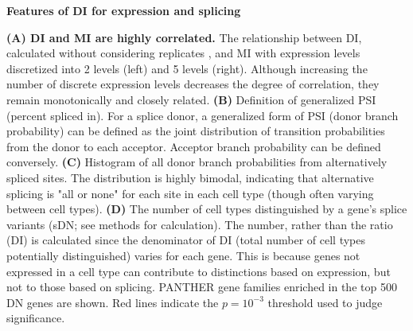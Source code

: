 \textbf{Features of DI for expression and splicing}

\textbf{(A) DI and MI are highly correlated.} The relationship between DI, calculated without considering replicates%
, and MI with expression levels discretized into 2 levels (left) and 5 levels (right). Although increasing the number of discrete expression levels decreases the degree of correlation, they remain monotonically and closely related.
\textbf{(B)} Definition of generalized PSI (percent spliced in). For a splice donor, a generalized form of PSI (donor branch probability) can be defined as the joint distribution of transition probabilities from the donor to each acceptor. Acceptor branch probability can be defined conversely. 
\textbf{(C)} Histogram of all donor branch probabilities from alternatively spliced sites. The distribution is highly bimodal, indicating that alternative splicing is "all or none" for each site in each cell type (though  often varying between cell types). 
\textbf{(D)} The number of cell types distinguished by a gene's splice variants (sDN; see methods for calculation). The number, rather than the ratio (DI) is calculated since the denominator of DI (total number of cell types potentially distinguished) varies for each gene. This is because genes not expressed in a cell type can contribute to distinctions based on expression, but not to those based on splicing.%
PANTHER gene families enriched in the top 500 DN genes are shown. Red lines indicate the $p=10^{-3}$ threshold used to judge significance.
